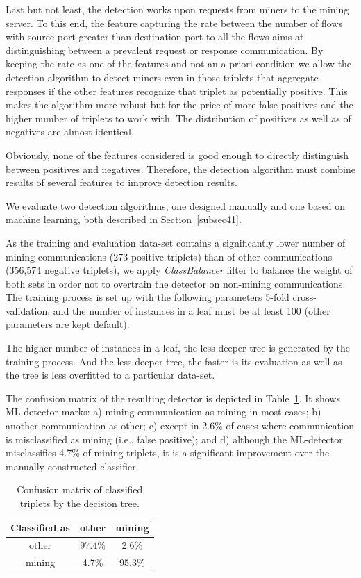\documentclass[preprint,12pt,3p]{elsarticle}
\begin{document}
Last but not least, the detection works upon requests from miners to the mining server. To this end, the feature capturing the rate between the number of flows with source port greater than destination port to all the flows aims at distinguishing between a prevalent request or response communication. By keeping the rate as one of the features and not an a priori condition we allow the detection algorithm to detect miners even in those triplets that aggregate responses if the other features recognize that triplet as potentially positive. This makes the algorithm more robust but for the price of more false positives and the higher number of triplets to work with. The distribution of positives as well as of negatives are almost identical.%
 
Obviously, none of the features considered is good enough to directly distinguish between positives and negatives. Therefore, the detection algorithm must combine results of several features to improve detection results.

We evaluate two detection algorithms, one designed manually and one based on machine learning, both described in Section~\ref{subsec41}.

As the training and evaluation data-set contains a significantly lower number of mining communications (273 positive triplets) than of other communications (356,574 negative triplets), we apply {\it ClassBalancer} filter to balance the weight of both sets in order not to overtrain the detector on non-mining communications.
The training process is set up with the following parameters 5-fold cross-validation, and the number of instances in a leaf must be at least 100 (other parameters are kept default).

The higher number of instances in a leaf, the less deeper tree is generated by the training process. And the less deeper tree, the faster is its evaluation as well as the tree is less overfitted to a particular data-set.

The confusion matrix of the resulting detector is depicted in Table~\ref{tab:conf1}. It shows ML-detector marks: a) mining communication as mining in most cases; b) another communication as other; c) except in 2.6\% of cases where communication is misclassified as mining (i.e., false positive); and d) although the ML-detector misclassifies 4.7\% of mining triplets, it is a significant improvement over the manually constructed classifier. 

\begin{table}[htp]
    \begin{center}
        \begin{tabular}{|c|c|c|}
            \hline
            Classified as & other & mining \\
            \hline
            other   & 97.4\% & 2.6\% \\
            mining  & 4.7\% & 95.3\% \\
            \hline
        \end{tabular}
    \caption{Confusion matrix of classified triplets by the decision tree.}
    \label{tab:conf1}
    \end{center}
\end{table}
\end{document}
